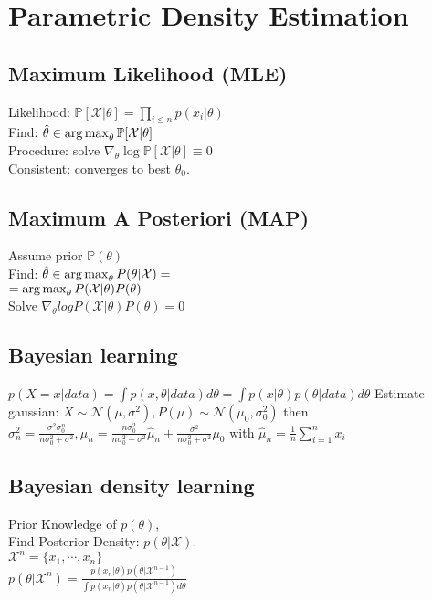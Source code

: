 \section*{Parametric Density Estimation}
\subsection*{Maximum Likelihood (MLE)}
Likelihood: $\mathbb{P}[\mathcal{X}|\theta]=\prod_{i\leq n}p(x_i|\theta)$\\
Find: $\hat{\theta}\in \operatorname*{arg\,max}_\theta \mathbb{P}[\mathcal{X}|\theta]$\\
Procedure: solve $\nabla_\theta \log \mathbb{P}[\mathcal{X}|\theta]\equiv 0$\\
Consistent: converges to best $\theta_0$.

\subsection*{Maximum A Posteriori (MAP)}
Assume prior $\mathbb{P}(\theta)$\\
Find: $\hat{\theta}\in \operatorname*{arg\,max}_\theta P(\theta|\mathcal{X}) =$\\
$=\operatorname*{arg\,max}_\theta P(\mathcal{X}|\theta)P(\theta)$\\
Solve $\nabla_\theta log P(\mathcal{X}|\theta)P(\theta)=0$

\subsection*{Bayesian learning}
$p(X=x|data) = \int p(x, \theta | data) d\theta = \int p(x|\theta)p(\theta|data)d\theta$
Estimate gaussian: $X \sim \mathcal{N}(\mu, \sigma^2), P(\mu) \sim \mathcal{N}(\mu_0, \sigma_0^2)$ then $\sigma_n^2 = \frac{\sigma^2 \sigma_0^n}{n\sigma_0^2 + \sigma^2}, \mu_n = \frac{n\sigma_0^2}{n\sigma_0^2 + \sigma^2} \hat \mu_n + \frac{\sigma^2}{n\sigma_0^2 + \sigma^2}\mu_0$ with $\hat \mu_n = \frac{1}{n}\sum_{i=1}^n x_i$
\subsection*{Bayesian density learning}
Prior Knowledge of $p(\theta)$,\\
Find Posterior Density: $p(\theta|\mathcal{X})$.\\
$\mathcal{X}^n=\{x_1, \cdots, x_n\}$\\
$p(\theta|\mathcal{X}^n)=\frac{p(x_n|\theta)p(\theta|\mathcal{X}^{n-1})}{\int p(x_n|\theta)p(\theta|\mathcal{X}^{n-1}) d\theta}$


